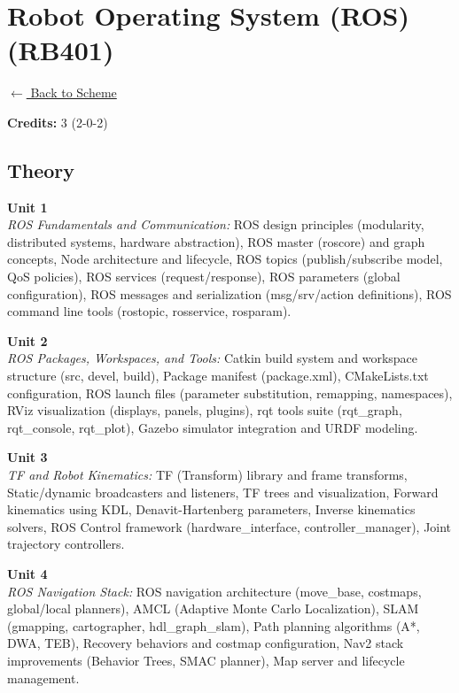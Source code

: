 \section*{Robot Operating System (ROS) (RB401)}
\label{major:RB_4}

\noindent \small{\hyperref[main:scheme]{$\leftarrow$ Back to Scheme}} \vspace{0.5cm}

\noindent \textbf{Credits:} 3 (2-0-2)

\subsection*{Theory}
\noindent\textbf{Unit 1} \\
\textit{ROS Fundamentals and Communication:} ROS design principles (modularity, distributed systems, hardware abstraction), ROS master (roscore) and graph concepts, Node architecture and lifecycle, ROS topics (publish/subscribe model, QoS policies), ROS services (request/response), ROS parameters (global configuration), ROS messages and serialization (msg/srv/action definitions), ROS command line tools (rostopic, rosservice, rosparam).

\vspace{0.3cm}

\noindent\textbf{Unit 2} \\
\textit{ROS Packages, Workspaces, and Tools:} Catkin build system and workspace structure (src, devel, build), Package manifest (package.xml), CMakeLists.txt configuration, ROS launch files (parameter substitution, remapping, namespaces), RViz visualization (displays, panels, plugins), rqt tools suite (rqt\_graph, rqt\_console, rqt\_plot), Gazebo simulator integration and URDF modeling.

\vspace{0.3cm}

\noindent\textbf{Unit 3} \\
\textit{TF and Robot Kinematics:} TF (Transform) library and frame transforms, Static/dynamic broadcasters and listeners, TF trees and visualization, Forward kinematics using KDL, Denavit-Hartenberg parameters, Inverse kinematics solvers, ROS Control framework (hardware\_interface, controller\_manager), Joint trajectory controllers.

\vspace{0.3cm}

\noindent\textbf{Unit 4} \\
\textit{ROS Navigation Stack:} ROS navigation architecture (move\_base, costmaps, global/local planners), AMCL (Adaptive Monte Carlo Localization), SLAM (gmapping, cartographer, hdl\_graph\_slam), Path planning algorithms (A*, DWA, TEB), Recovery behaviors and costmap configuration, Nav2 stack improvements (Behavior Trees, SMAC planner), Map server and lifecycle management.

